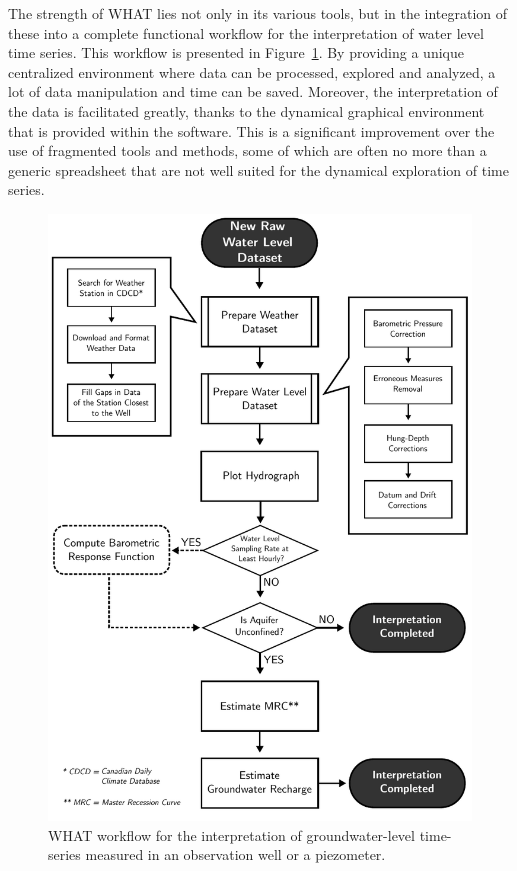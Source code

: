 \documentclass[WHATMANUAL.tex]{subfiles}
\begin{document}
The strength of WHAT lies not only in its various tools, but in the integration of these into a complete functional workflow for the interpretation of water level time series. This workflow is presented in Figure~\ref{fig:WHAT_workflow}. By providing a unique centralized environment where data can be processed, explored and analyzed, a lot of data manipulation and time can be saved. Moreover, the interpretation of the data is facilitated greatly, thanks to the dynamical graphical environment that is provided within the software. This is a significant improvement over the use of fragmented tools and methods, some of which are often no more than a generic spreadsheet that are not well suited for the dynamical exploration of time series.

\begin{figure}
\centering
\includegraphics[height=0.95\textheight]{img/WHAT_Workflow}
\caption[WHAT workflow.]{WHAT workflow for the interpretation of groundwater-level time-series measured in an observation well or a piezometer.}
\label{fig:WHAT_workflow}
\end{figure}
\end{document}

